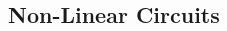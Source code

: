\subsection{Non-Linear Circuits}%
\label{sub:amplifier-analysis}


\begin{multicols}{2}


\end{multicols}

